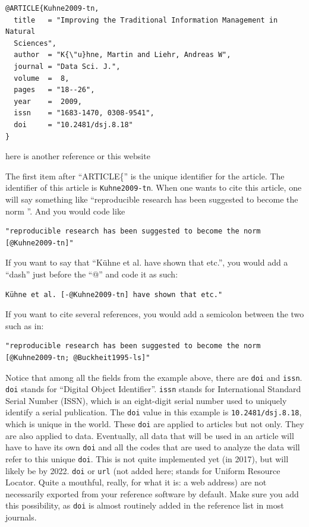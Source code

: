 \documentclass[]{book}
\theoremstyle{definition}
\theoremstyle{definition}
\theoremstyle{definition}
\theoremstyle{remark}
\begin{document}
\begin{verbatim}
@ARTICLE{Kuhne2009-tn,
  title   = "Improving the Traditional Information Management in Natural
  Sciences",
  author  = "K{\"u}hne, Martin and Liehr, Andreas W",
  journal = "Data Sci. J.",
  volume  =  8,
  pages   = "18--26",
  year    =  2009,
  issn    = "1683-1470, 0308-9541",
  doi     = "10.2481/dsj.8.18"
}
\end{verbatim}

here is another reference \citep{Maxwell2018-ht} or this website
\citep{Wikipedia_contributors2018-ia}

The first item after ``ARTICLE\{'' is the unique identifier for the
article. The identifier of this article is \texttt{Kuhne2009-tn}. When
one wants to cite this article, one will say something like
``reproducible research has been suggested to become the norm
\citep{Kuhne2009-tn}''. And you would code like

\begin{verbatim}
"reproducible research has been suggested to become the norm [@Kuhne2009-tn]"
\end{verbatim}

If you want to say that ``Kühne et al. \citeyearpar{Kuhne2009-tn} have
shown that etc.'', you would add a ``dash'' just before the ``@'' and
code it as such:

\begin{verbatim}
Kühne et al. [-@Kuhne2009-tn] have shown that etc."
\end{verbatim}

If you want to cite several references, you would add a semicolon
between the two such as in:

\begin{verbatim}
"reproducible research has been suggested to become the norm [@Kuhne2009-tn; @Buckheit1995-ls]"
\end{verbatim}

Notice that among all the fields from the example above, there are
\texttt{doi} and \texttt{issn}. \texttt{doi} stands for ``Digital Object
Identifier''. \texttt{issn} stands for International Standard Serial
Number (ISSN), which is an eight-digit serial number used to uniquely
identify a serial publication. The \texttt{doi} value in this example is
\texttt{10.2481/dsj.8.18}, which is unique in the world. These
\texttt{doi} are applied to articles but not only. They are also applied
to data. Eventually, all data that will be used in an article will have
to have its own \texttt{doi} and all the codes that are used to analyze
the data will refer to this unique \texttt{doi}. This is not quite
implemented yet (in 2017), but will likely be by 2022. \texttt{doi} or
\texttt{url} (not added here; stands for Uniform Resource Locator. Quite
a mouthful, really, for what it is: a web address) are not necessarily
exported from your reference software by default. Make sure you add this
possibility, as \texttt{doi} is almost routinely added in the reference
list in most journals.
\end{document}
